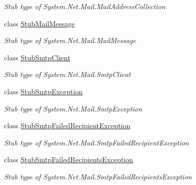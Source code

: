 \begin{DoxyCompactItemize}
\begin{DoxyCompactList}\small\item\em Stub type of System.\-Net.\-Mail.\-Mail\-Address\-Collection\end{DoxyCompactList}\item 
class \hyperlink{class_system_1_1_net_1_1_mail_1_1_fakes_1_1_stub_mail_message}{Stub\-Mail\-Message}
\begin{DoxyCompactList}\small\item\em Stub type of System.\-Net.\-Mail.\-Mail\-Message\end{DoxyCompactList}\item 
class \hyperlink{class_system_1_1_net_1_1_mail_1_1_fakes_1_1_stub_smtp_client}{Stub\-Smtp\-Client}
\begin{DoxyCompactList}\small\item\em Stub type of System.\-Net.\-Mail.\-Smtp\-Client\end{DoxyCompactList}\item 
class \hyperlink{class_system_1_1_net_1_1_mail_1_1_fakes_1_1_stub_smtp_exception}{Stub\-Smtp\-Exception}
\begin{DoxyCompactList}\small\item\em Stub type of System.\-Net.\-Mail.\-Smtp\-Exception\end{DoxyCompactList}\item 
class \hyperlink{class_system_1_1_net_1_1_mail_1_1_fakes_1_1_stub_smtp_failed_recipient_exception}{Stub\-Smtp\-Failed\-Recipient\-Exception}
\begin{DoxyCompactList}\small\item\em Stub type of System.\-Net.\-Mail.\-Smtp\-Failed\-Recipient\-Exception\end{DoxyCompactList}\item 
class \hyperlink{class_system_1_1_net_1_1_mail_1_1_fakes_1_1_stub_smtp_failed_recipients_exception}{Stub\-Smtp\-Failed\-Recipients\-Exception}
\begin{DoxyCompactList}\small\item\em Stub type of System.\-Net.\-Mail.\-Smtp\-Failed\-Recipients\-Exception\end{DoxyCompactList}\end{DoxyCompactItemize}
